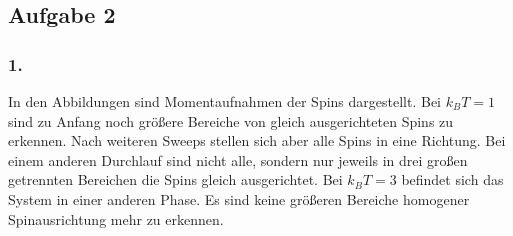 \subsection{Aufgabe 2} 
\subsubsection{1.}

In den Abbildungen sind Momentaufnahmen der Spins dargestellt. 
Bei $k_BT = 1$ sind zu Anfang noch größere Bereiche von gleich ausgerichteten Spins zu erkennen.
Nach weiteren Sweeps stellen sich aber alle Spins in eine Richtung.
Bei einem anderen Durchlauf sind nicht alle, sondern nur jeweils in drei großen getrennten Bereichen die Spins gleich ausgerichtet. 
Bei $k_BT = 3$ befindet sich das System in einer anderen Phase. 
Es sind keine größeren Bereiche homogener Spinausrichtung mehr zu erkennen.
